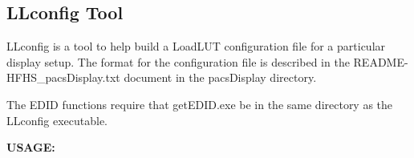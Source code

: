 
\subsection{LLconfig Tool}

LLconfig is a tool to help build a LoadLUT configuration file for a particular display setup. The format for the configuration file is described in the \textnormal{README-HFHS\_pacsDisplay.txt} document in the pacsDisplay directory. 

 The EDID functions require that \textnormal{getEDID.exe} be in the same directory as the LLconfig executable. 

\textbf{USAGE:}

